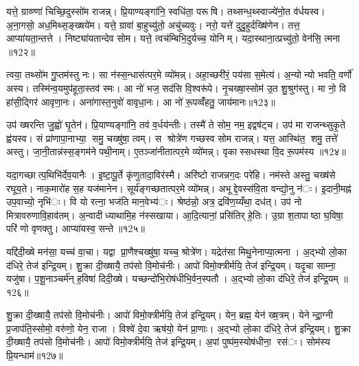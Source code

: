 
यत्ते॒ ग्राव्ण्णा॑ चिच्छि॒दुस्सो॑म राजन्न्। प्रि॒याण्यङ्गा॑नि॒ स्वधि॑ता॒ परूषि। तथ्सन्ध॒थ्स्वाज्ये॑नो॒त व॑र्धयस्व। अ॒ना॒गसो॒ अध॒मिथ्स॒ङ्ख्षये॑म। यत्ते॒ ग्रावा॑ बा॒हुच्यु॑तो॒ अचु॑च्यवुः। नरो॒ यत्ते॑ दुदु॒हुर्दख्षि॑णेन। तत्त॒ आप्या॑यता॒न्तत्ते। निष्ट्या॑यतान्देव सोम। यत्ते॒ त्वच॑म्बिभि॒दुर्यच्च॒ योनिम्। यदा॒स्थाना॒त्प्रच्यु॑तो॒ वेन॑सि॒ त्मना ॥१2२॥

त्वया॒ तथ्सो॑म गु॒प्तम॑स्तु नः। सा न॑स्स॒न्धास॑त्पर॒मे व्यो॑मन्न्। अहा॒च्छरी॑रं॒ पय॑सा स॒मेत्य॑। अ॒न्योन्यो भवति॒ वर्णो॑ अस्य। तस्मि॑न्व॒यमुप॑हूता॒स्तव॑ स्मः। आ नो॑ भज॒ सद॑सि वि॒श्वरू॑पे। नृ॒चख्षा॒स्सोम॑ उ॒त शु॒श्रुग॑स्तु। मा नो॒ वि हा॑सी॒द्गिर॑ आवृणा॒नः। अना॑गास्त॒नुवो॑ वावृधा॒नः। आ नो॑ रू॒पव्वँ॑हतु॒ जाय॑मानः॥१2३॥

उप॑ ख्षरन्ति जु॒ह्वो॑ घृ॒तेन॑। प्रि॒याण्यङ्गा॑नि॒ तव॑ व॒र्धय॑न्तीः। तस्मै॑ ते सोम॒ नम॒ इद्वष॑ट्च। उप॑ मा राजन्थ्सुकृ॒ते ह्व॑यस्व। सं प्रा॑णापा॒नाभ्या॒ समु॒ चख्षु॑षा॒ त्वम्। स श्रोत्रे॑ण गच्छस्व सोम राजन्न्। यत्त॒ आस्थि॑त॒ शमु॒ तत्ते॑ अस्तु। जा॒नी॒तान्न॑स्स॒ङ्गम॑ने पथी॒नाम्। ए॒तञ्जा॑नीतात्पर॒मे व्यो॑मन्न्। वृकास्सधस्था वि॒द रू॒पम॑स्य ॥१2४॥

यदा॒गच्छात्प॒थिभि॑र्देव॒यानैः। इ॒ष्टा॒पू॒र्ते कृ॑णुतादा॒विर॑स्मै। अरि॑ष्टो राजन्नग॒दः परे॑हि। नम॑स्ते अस्तु॒ चख्ष॑से रघूय॒ते। नाक॒मारो॑ह स॒ह यज॑मानेन। सूर्य॑ङ्गच्छतात्पर॒मे व्यो॑मन्न्। अभूद्दे॒वस्स॑वि॒ता वन्द्यो॒नु न॑ः। इ॒दानी॒मह्न॑ उप॒वाच्यो॒ नृभि॑ः। वि यो रत्ना॒ भज॑ति मान॒वेभ्य॑ः। श्रेष्ठ॑न्नो॒ अत्र॒ द्रवि॑ण॒य्यँथा॒ दध॑त्। उप॑ नो मित्रावरुणावि॒हाव॑तम्। अ॒न्वादीध्याथामि॒ह न॑स्सखाया। आ॒दि॒त्यानां॒ प्रसि॑तिर् हे॒तिः। उ॒ग्रा श॒तापाष्ठा घ॒विषा॒ परि॑ णो वृणक्तु। आप्या॑यस्व॒ सन्ते॥१2५॥


यद्दि॑दी॒ख्षे मन॑सा॒ यच्च॑ वा॒चा। यद्वा प्रा॒णैश्चख्षु॑षा॒ यच्च॒ श्रोत्रे॑ण। यद्रेत॑सा मिथु॒नेनाप्या॒त्मना। अ॒द्भ्यो लो॒का द॑धिरे॒ तेज॑ इन्द्रि॒यम्। शु॒क्रा दी॒ख्षायै॒ तप॑सो वि॒मोच॑नीः। आपो॑ विमो॒क्त्रीर्मयि॒ तेज॑ इन्द्रि॒यम्। यदृ॒चा साम्ना॒ यजु॑षा। प॒शू॒नाञ्चर्म॑न् ह॒विषा॑ दिदी॒ख्षे। यच्छन्दो॑भि॒रोष॑धीभि॒र्वन॒स्पतौ। अ॒द्भ्यो लो॒का द॑धिरे॒ तेज॑ इन्द्रि॒यम् ॥१2६॥

शु॒क्रा दी॒ख्षायै॒ तप॑सो वि॒मोच॑नीः। आपो॑ विमो॒क्त्रीर्मयि॒ तेज॑ इन्द्रि॒यम्। येन॒ ब्रह्म॒ येन॑ ख्ष॒त्रम्। येनेन्द्रा॒ग्नी प्र॒जाप॑ति॒स्सोमो॒ वरु॑णो॒ येन॒ राजा। विश्वे॑ दे॒वा ऋष॑यो॒ येन॑ प्रा॒णाः। अ॒द्भ्यो लो॒का द॑धिरे॒ तेज॑ इन्द्रि॒यम्। शु॒क्रा दी॒ख्षायै॒ तप॑सो वि॒मोच॑नीः। आपो॑ विमो॒क्त्रीर्मयि॒ तेज॑ इन्द्रि॒यम्। अ॒पां पुष्प॑म॒स्योष॑धीना॒ रस॑ः। सोम॑स्य प्रि॒यन्धाम॑॥१2७॥

